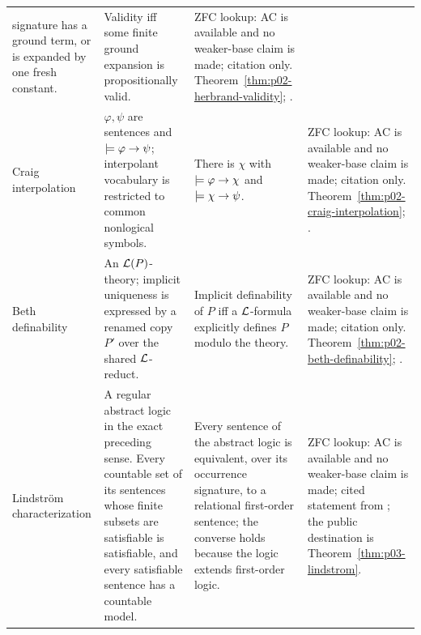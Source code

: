 \begin{landscape}
\begin{longtable}{@{}p{1.15in}p{2.15in}p{2.25in}p{1.65in}@{}}
signature has a ground term, or is expanded by one fresh constant. &
Validity iff some finite ground expansion is propositionally valid. &
ZFC lookup: AC is available and no weaker-base claim is made; citation only.
Theorem~\ref{thm:p02-herbrand-validity};
\cite{AfshariEnqvistLeigh2025}. \\
\addlinespace
Craig interpolation &
\(\varphi,\psi\) are sentences and \(\models\varphi\to\psi\); interpolant
vocabulary is restricted to common nonlogical symbols. &
There is \(\chi\) with \(\models\varphi\to\chi\) and
\(\models\chi\to\psi\). &
ZFC lookup: AC is available and no weaker-base claim is made; citation only.
Theorem~\ref{thm:p02-craig-interpolation}; \cite{Craig1957}. \\
\addlinespace
Beth definability &
An \(\mathcal{L}(P)\)-theory; implicit uniqueness is expressed by a renamed
copy \(P'\) over the shared \(\mathcal{L}\)-reduct. &
Implicit definability of \(P\) iff a \(\mathcal{L}\)-formula explicitly
defines \(P\) modulo the theory. &
ZFC lookup: AC is available and no weaker-base claim is made; citation only.
Theorem~\ref{thm:p02-beth-definability}; \cite{Beth1953}. \\
\addlinespace
Lindstr\"om characterization &
A regular abstract logic in the exact preceding sense.  Every countable set of
its sentences whose finite subsets are satisfiable is satisfiable, and every
satisfiable sentence has a countable model. &
Every sentence of the abstract logic is equivalent, over its occurrence
signature, to a relational first-order sentence; the converse holds because
the logic extends first-order logic. &
ZFC lookup: AC is available and no weaker-base claim is made; cited statement
from \cite{Lindstrom1969,EbbinghausFlumThomas1994}; the public destination is
Theorem~\ref{thm:p03-lindstrom}. \\
\bottomrule
\end{longtable}
\endgroup
\end{landscape}
